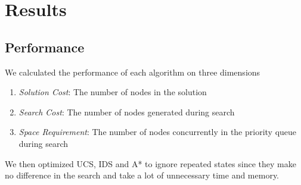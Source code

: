 \documentclass[12pt]{diazessay}
\begin{document}
\clearpage
\section{Results}    
    \subsection{Performance}
        We calculated the performance of each algorithm on three dimensions
        \begin{enumerate}
            \item \textit{Solution Cost}: The number of nodes in the solution
            \item \textit{Search Cost}: The number of nodes generated during search
            \item \textit{Space Requirement}: The number of nodes concurrently in the priority queue during search
        \end{enumerate}
        We then optimized UCS, IDS and A* to ignore repeated states since they make no difference in the search and take a lot of unnecessary time and memory.
\end{document}
